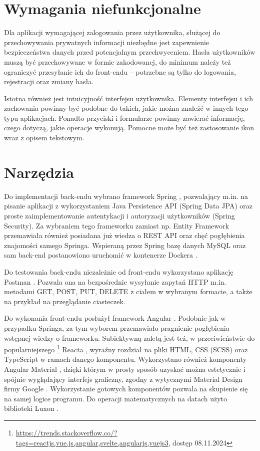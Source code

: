 \documentclass[a4paper,twoside,12pt]{book}
\begin{document}
\section{Wymagania niefunkcjonalne}

Dla aplikacji wymagającej zalogowania przez użytkownika, służącej do przechowywania prywatnych informacji niezbędne jest zapewnienie bezpieczeństwa danych przed potencjalnym przechwyceniem. Hasła użytkowników muszą być przechowywane w formie zakodowanej, do minimum należy też ograniczyć przesyłanie ich do front-endu -- potrzebne są tylko do logowania, rejestracji oraz zmiany hasła.

Istotna również jest intuicyjność interfejsu użytkownika. Elementy interfejsu i ich zachowania powinny być podobne do takich, jakie można znaleźć w innych tego typu aplikacjach. Ponadto przyciski i formularze powinny zawierać informację, czego dotyczą, jakie operacje wykonują. Pomocne może być też zastosowanie ikon wraz z opisem tekstowym.

\section{Narzędzia}

Do implementacji back-endu wybrano framework Spring \cite{bib:spring}, pozwalający m.in. na pisanie aplikacji z wykorzystaniem Java Persistence API (Spring Data JPA) oraz proste zaimplementowanie autentykacji i autoryzacji użytkowników (Spring Security). Za wybraniem tego frameworku zamiast np. Entity Framework \cite{bib:entityframework} przemawiała również posiadana już wiedza o REST API oraz chęć pogłębienia znajomości samego Springa.
Wspieraną przez Spring bazę danych MySQL \cite{bib:mysql} oraz sam back-end postanowiono uruchomić w kontenerze Dockera \cite{bib:docker}.

Do testowania back-endu niezależnie od front-endu wykorzystano aplikację Postman \cite{bib:postman}. Pozwala ona na bezpośrednie wysyłanie zapytań HTTP m.in. metodami GET, POST, PUT, DELETE z ciałem w wybranym formacie, a także na przykład na przeglądanie ciasteczek.

Do wykonania front-endu posłużył framework Angular \cite{bib:angularnew,bib:angularold}. Podobnie jak w przypadku Springa, za tym wyborem przemawiało pragnienie pogłębienia wstępnej wiedzy o frameworku. Subiektywną zaletą jest też, w przeciwieństwie do popularniejszego \footnote{\url{https://trends.stackoverflow.co/?tags=reactjs,vue.js,angular,svelte,angularjs,vuejs3}, dostęp 08.11.2024} Reacta \cite{bib:react}, wyraźny rozdział na pliki HTML, CSS (SCSS) oraz TypeScript w ramach danego komponentu. 
Wykorzystano również komponenty Angular Material \cite{bib:angularmaterial}, dzięki którym w prosty sposób uzyskać można estetycznie i spójnie wyglądający interfejs graficzny, zgodny z wytycznymi Material Design firmy Google \cite{bib:material}. Wykorzystanie gotowych komponentów pozwala na skupienie się na samej logice programu. Do operacji matematycznych na datach użyto biblioteki Luxon \cite{bib:luxon}.
\end{document}
